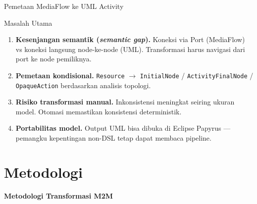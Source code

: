 \documentclass[aspectratio=169, table]{beamer}
\begin{document}
\begin{frame}{Pemetaan MediaFlow ke UML Activity}
\begin{figure}
{
}

\label{fig:ch11-mapping-visual}
\end{figure}
\end{frame}

\begin{frame}{Masalah Utama}
\vspace{6pt}
\begin{enumerate}
  \item \textbf{Kesenjangan semantik (\textit{semantic gap}).} Koneksi via Port (MediaFlow) vs koneksi langsung node-ke-node (UML). Transformasi harus navigasi dari port ke node pemiliknya.
  \item \textbf{Pemetaan kondisional.} \texttt{Resource} $\rightarrow$ \texttt{InitialNode} / \texttt{ActivityFinalNode} / \texttt{OpaqueAction} berdasarkan analisis topologi.
  \item \textbf{Risiko transformasi manual.} Inkonsistensi meningkat seiring ukuran model. Otomasi memastikan konsistensi deterministik.
  \item \textbf{Portabilitas model.} Output UML bisa dibuka di Eclipse Papyrus --- pemangku kepentingan non-DSL tetap dapat membaca pipeline.
\end{enumerate}
\end{frame}

\section{Metodologi}
\begin{frame}{\hfill}
	\centering
	\Huge{\textbf{Metodologi Transformasi M2M}}
\end{frame}
\end{document}

